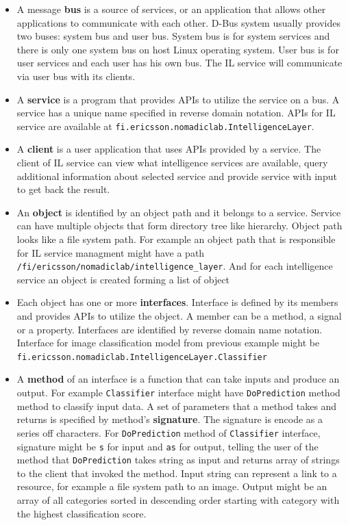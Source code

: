 \documentclass[english, 12pt, a4paper, elec, utf8, online]{aaltothesis}
\begin{document}
\begin{itemize}
\item
A message \textbf{bus} is a source of services, or an application that allows other applications to communicate with each other. D-Bus system usually provides two buses: system bus and user bus. System bus is for system services and there is only one system bus on host Linux operating system. User bus is for user services and each user has his own bus. The IL service will communicate via user bus with its clients.  
\item
A \textbf{service} is a program that provides APIs to utilize the service on a bus. A service has a unique name specified in reverse domain notation. APIs for IL service are available at \texttt{fi.ericsson.nomadiclab.IntelligenceLayer}.   
\item
A \textbf{client} is a user application that uses APIs provided by a service. The client of IL service can view what intelligence services are available, query additional information about selected service and provide service with input to get back the result.  
\item
An \textbf{object} is identified by an object path and it belongs to a service. Service can have multiple objects that form directory tree like hierarchy. Object path looks like a file system path. For example an object path that is responsible for IL service managment might have a path \texttt{/fi/ericsson/nomadiclab/intelligence\_layer}. And for each intelligence service an object is created forming a list of object

\item
Each object has one or more \textbf{interfaces}. Interface is defined by its members and provides APIs to utilize the object. A member can be a method, a signal or a property. Interfaces are identified by reverse domain name notation. Interface for image classification  model from previous example might be \texttt{fi.ericsson.nomadiclab.IntelligenceLayer.Classifier}     
\item
A \textbf{method} of an interface is a function that can take inputs and produce an output. For example \texttt{Classifier} interface might have \texttt{DoPrediction} method method to classify input data. A set of parameters that a method takes and returns is specified by method's \textbf{signature}. The signature is encode as a series off characters. For \texttt{DoPrediction} method of \texttt{Classifier} interface, signature might be \texttt{s} for input and \texttt{as} for output, telling the user of the method that \texttt{DoPrediction} takes string as input and returns array of strings to the client that invoked the method. Input string can represent a link to a resource, for example a file system path to an image. Output might be an array of all categories sorted in descending order starting with category with the highest classification score.             

\end{itemize}
\end{document}
